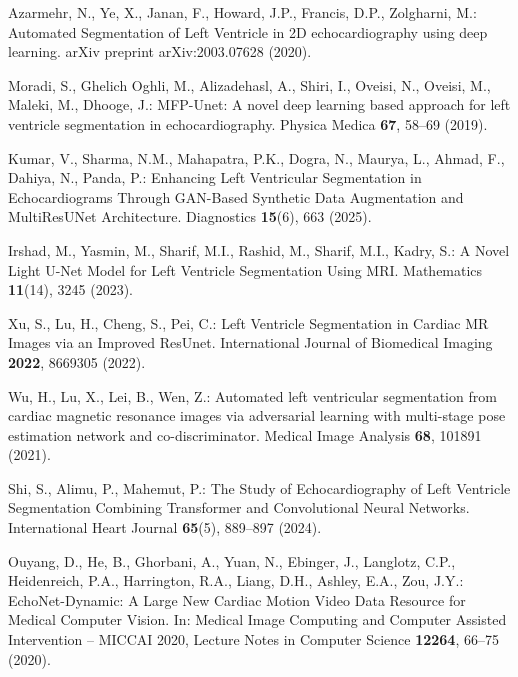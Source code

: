 \documentclass[runningheads]{llncs}
\begin{document}
\begin{thebibliography}{99}

Azarmehr, N., Ye, X., Janan, F., Howard, J.P., Francis, D.P., Zolgharni, M.: Automated Segmentation of Left Ventricle in 2D echocardiography using deep learning. arXiv preprint arXiv:2003.07628 (2020). 

Moradi, S., Ghelich Oghli, M., Alizadehasl, A., Shiri, I., Oveisi, N., Oveisi, M., Maleki, M., Dhooge, J.: MFP-Unet: A novel deep learning based approach for left ventricle segmentation in echocardiography. Physica Medica \textbf{67}, 58--69 (2019). 


Kumar, V., Sharma, N.M., Mahapatra, P.K., Dogra, N., Maurya, L., Ahmad, F., Dahiya, N., Panda, P.: Enhancing Left Ventricular Segmentation in Echocardiograms Through GAN-Based Synthetic Data Augmentation and MultiResUNet Architecture. Diagnostics \textbf{15}(6), 663 (2025). 


Irshad, M., Yasmin, M., Sharif, M.I., Rashid, M., Sharif, M.I., Kadry, S.: A Novel Light U-Net Model for Left Ventricle Segmentation Using MRI. Mathematics \textbf{11}(14), 3245 (2023). 

Xu, S., Lu, H., Cheng, S., Pei, C.: Left Ventricle Segmentation in Cardiac MR Images via an Improved ResUnet. International Journal of Biomedical Imaging \textbf{2022}, 8669305 (2022). 

Wu, H., Lu, X., Lei, B., Wen, Z.: Automated left ventricular segmentation from cardiac magnetic resonance images via adversarial learning with multi-stage pose estimation network and co-discriminator. Medical Image Analysis \textbf{68}, 101891 (2021). 

Shi, S., Alimu, P., Mahemut, P.: The Study of Echocardiography of Left Ventricle Segmentation Combining Transformer and Convolutional Neural Networks. International Heart Journal \textbf{65}(5), 889--897 (2024). 

Ouyang, D., He, B., Ghorbani, A., Yuan, N., Ebinger, J., Langlotz, C.P., Heidenreich, P.A., Harrington, R.A., Liang, D.H., Ashley, E.A., Zou, J.Y.: EchoNet-Dynamic: A Large New Cardiac Motion Video Data Resource for Medical Computer Vision. In: Medical Image Computing and Computer Assisted Intervention -- MICCAI 2020, Lecture Notes in Computer Science \textbf{12264}, 66--75 (2020). 


\end{thebibliography}
\end{document}

